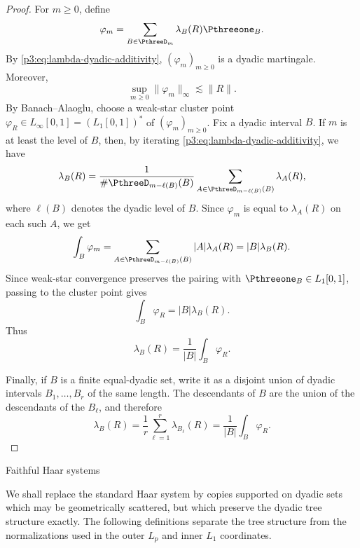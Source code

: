 \documentclass[11pt,reqno]{amsart}
\makeatletter
\theoremstyle{plain}
\theoremstyle{definition}
\newcounter{problempaper}
\newenvironment{problempaperbody}{%
  \setcounter{subsection}{0}%
  \setcounter{subsubsection}{0}%
  \setcounter{paragraph}{0}%
  \renewcommand{\thesubsection}{\arabic{subsection}}%
  \renewcommand{\thesubsubsection}{\thesubsection.\arabic{subsubsection}}%
  \renewcommand{\theparagraph}{\thesubsubsection.\arabic{paragraph}}%
  \let\problem@outersection\section
  \let\problem@outersubsection\subsection
  \let\problem@outersubsubsection\subsubsection
  \let\problem@outerparagraph\paragraph
  \let\section\problem@papersection
  \let\subsection\problem@papersubsection
  \let\subsubsection\problem@papersubsubsection
}{%
  \let\section\problem@outersection
  \let\subsection\problem@outersubsection
  \let\subsubsection\problem@outersubsubsection
  \let\paragraph\problem@outerparagraph
}
\newcommand{\problem@target}[2]{%
  \hypertarget{problem-\theproblempaper-#1-#2}{}%
}
\newcommand{\problem@paperheading}[3]{%
  \par\bigskip
  \problem@target{#1}{#2}%
  \noindent{\large\bfseries #2.\quad #3\par}%
  \nobreak\smallskip
}
\newcommand{\problem@papersubheading}[3]{%
  \par\medskip
  \problem@target{#1}{#2}%
  \noindent{\normalsize\bfseries #2.\quad #3\par}%
  \nobreak\smallskip
}
\newcommand{\problem@papersubsubheading}[3]{%
  \par\smallskip
  \problem@target{#1}{#2}%
  \noindent{\normalsize\itshape #2.\quad #3.\ }%
}
\def\problem@papersection{%
  \@ifstar{\problem@papersectionstar}{\problem@papersectionnostar}%
}
\def\problem@papersectionstar#1{%
  \par\bigskip\noindent{\large\bfseries #1\par}\nobreak\smallskip
}
\def\problem@papersectionnostar#1{%
  \refstepcounter{subsection}%
  \setcounter{subsubsection}{0}%
  \setcounter{paragraph}{0}%
  \problem@paperheading{section}{\thesubsection}{#1}%
  \problem@writecontentsline{section}{\thesubsection}{#1}%
}
\def\problem@papersubsection{%
  \@ifstar{\problem@papersubsectionstar}{\problem@papersubsectionnostar}%
}
\def\problem@papersubsectionstar#1{%
  \par\medskip\noindent{\normalsize\bfseries #1\par}\nobreak\smallskip
}
\def\problem@papersubsectionnostar#1{%
  \refstepcounter{subsubsection}%
  \setcounter{paragraph}{0}%
  \problem@papersubheading{subsection}{\thesubsubsection}{#1}%
  \problem@writecontentsline{subsection}{\thesubsubsection}{#1}%
}
\def\problem@papersubsubsection{%
  \@ifstar{\problem@papersubsubsectionstar}{\problem@papersubsubsectionnostar}%
}
\def\problem@papersubsubsectionstar#1{%
  \par\smallskip\noindent{\normalsize\itshape #1.\ }%
}
\def\problem@papersubsubsectionnostar#1{%
  \refstepcounter{paragraph}%
  \problem@papersubsubheading{subsubsection}{\theparagraph}{#1}%
  \problem@writecontentsline{subsubsection}{\theparagraph}{#1}%
}
\newcommand{\problem@writecontentsline}[3]{%
  \begingroup
  \protected@write\@auxout{}{%
    \string\problemcontentsentry{\theproblempaper}{#1}{#2}{#3}{\thepage}%
  }%
  \endgroup
}
\newcommand{\problemcontentsentry}[5]{%
  \@ifundefined{problemcontents@#1}{%
    \expandafter\gdef\csname problemcontents@#1\endcsname{}%
  }{}%
  \expandafter\g@addto@macro\csname problemcontents@#1\endcsname{%
    \problemcontentsline{#1}{#2}{#3}{#4}{#5}%
  }%
}
\newcommand{\problemcontentslink}[4]{%
  \hyperlink{problem-#1-#2-#3}{#4}%
}
\newcommand{\problemcontentsline}[5]{%
  \ifstrequal{#2}{section}{%
    \par\noindent
    \problemcontentslink{#1}{#2}{#3}{\makebox[2.5em][l]{#3}#4}%
    \nobreak\dotfill
    \problemcontentslink{#1}{#2}{#3}{#5}\par
  }{%
    \ifstrequal{#2}{subsection}{%
      \par\noindent\hspace*{1.5em}%
      \problemcontentslink{#1}{#2}{#3}{\makebox[3.5em][l]{#3}#4}%
      \nobreak\dotfill
      \problemcontentslink{#1}{#2}{#3}{#5}\par
    }{%
      \par\noindent\hspace*{3em}%
      \problemcontentslink{#1}{#2}{#3}{\makebox[4.5em][l]{#3}#4}%
      \nobreak\dotfill
      \problemcontentslink{#1}{#2}{#3}{#5}\par
    }%
  }%
}
\makeatother
\begin{document}
\begin{problempaperbody}
\begin{proof}
For $m\geq 0$, define
\begin{equation*}
        \varphi_m=\sum_{B\in\PthreeD_m}\lambda_B(R)\Pthreeone_B.
\end{equation*}
By \eqref{p3:eq:lambda-dyadic-additivity}, $(\varphi_m)_{m\geq 0}$ is a dyadic martingale. Moreover,
\begin{equation*}
        \sup_{m\geq 0}\|\varphi_m\|_\infty\lesssim \|R\|.
\end{equation*}
By Banach--Alaoglu, choose a weak-star cluster point $\varphi_R\in L_\infty[0,1]=(L_1[0,1])^*$ of $(\varphi_m)_{m\geq 0}$. Fix a dyadic interval $B$. If $m$ is at least the level of $B$, then, by iterating \eqref{p3:eq:lambda-dyadic-additivity}, we have
\begin{equation*}
        \lambda_B(R)=\frac1{\#\PthreeD_{m-\ell(B)}(B)}\sum_{A\in\PthreeD_{m-\ell(B)}(B)}\lambda_A(R),
\end{equation*}
where $\ell(B)$ denotes the dyadic level of $B$. Since $\varphi_m$ is equal to $\lambda_A(R)$ on each such $A$, we get
\begin{equation*}
        \int_B\varphi_m=\sum_{A\in\PthreeD_{m-\ell(B)}(B)}|A|\lambda_A(R)=|B|\lambda_B(R).
\end{equation*}
Since weak-star convergence preserves the pairing with $\Pthreeone_B\in L_1[0,1]$, passing to the cluster point gives
\begin{equation*}
        \int_B\varphi_R=|B|\lambda_B(R).
\end{equation*}
Thus
\begin{equation*}
        \lambda_B(R)=\frac1{|B|}\int_B\varphi_R .
\end{equation*}

Finally, if $B$ is a finite equal-dyadic set, write it as a disjoint union of dyadic intervals $B_1,\ldots,B_r$ of the same length. The descendants of $B$ are the union of the descendants of the $B_\ell$, and therefore
\begin{equation*}
        \lambda_B(R) = \frac1r\sum_{\ell=1}^r\lambda_{B_\ell}(R) =
        \frac1{|B|}\int_B\varphi_R .
\end{equation*}
\end{proof}

\section{Faithful Haar systems}
\label{p3:sec:faithful-systems}

We shall replace the standard Haar system by copies supported on dyadic sets which may be geometrically scattered, but which preserve the dyadic tree structure exactly. The following definitions separate the tree structure from the normalizations used in the outer $L_p$ and inner $L_1$ coordinates.


\end{problempaperbody}
\end{document}
